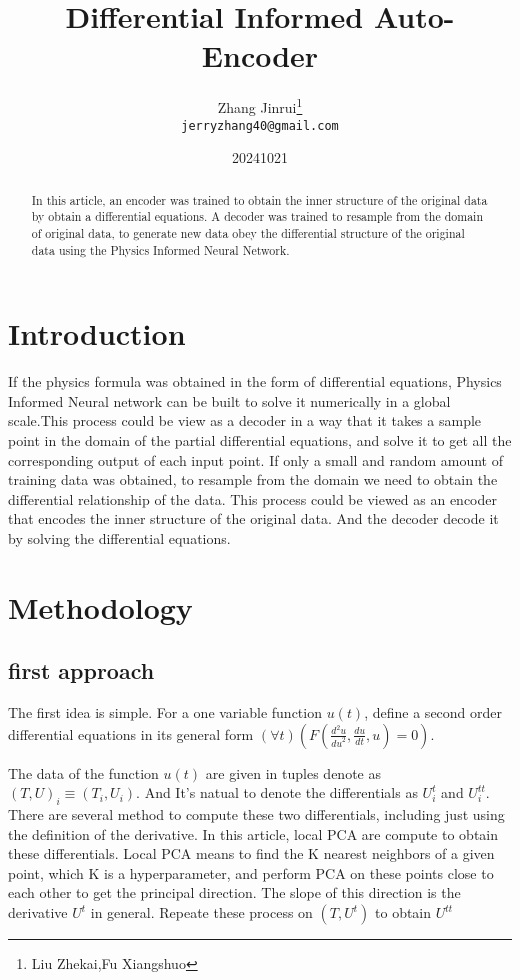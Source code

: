 \documentclass{article}
\title{Differential Informed Auto-Encoder}
\author{Zhang Jinrui\thanks{Liu Zhekai,Fu Xiangshuo} \\ \texttt{jerryzhang40@gmail.com}}
\date{20241021}  %
\begin{document}
\maketitle

\begin{abstract}
    In this article, an encoder was trained to obtain the inner
    structure of the original data by obtain a differential equations.
    A decoder was trained to resample from the domain of original data,
    to generate new data obey the differential structure of the original
    data using the Physics Informed Neural Network\cite[PINN]{raissi2017physics}.
\end{abstract}

\section{Introduction}
If the physics formula was obtained in the form of differential equations,
Physics Informed Neural network can be built to solve it numerically
in a global scale\cite[PINN]{raissi2017physics}.This process could be view
as a decoder in a way that it takes a sample point in the domain of
the partial differential equations, and solve it to get all the corresponding
output of each input point. If only a small and random amount of
training data was obtained, to resample from the domain we need
to obtain the differential relationship of the data. This process
could be viewed as an encoder that encodes the inner structure of
the original data. And the decoder decode it by solving the
differential equations.

\section{Methodology}
\subsection{first approach}
The first idea is simple. For a one variable function $u(t)$,
define a second order differential equations
in its general form $(\forall t)(F(\frac{d^2u}{{du}^2},\frac{du}{dt},u)=0)$.

The data of the function $u(t)$ are given in tuples denote as
$(T,U)_i\equiv(T_i,U_i)$. And It's natual to denote the differentials
as $U^{t}_{i}$ and $U^{tt}_{i}$. There are several method to compute
these two differentials, including just using the definition of
the derivative. In this article, local PCA are compute to obtain
these differentials. Local PCA means to find the K nearest neighbors
of a given point, which K is a hyperparameter, and perform PCA
on these points close to each other to get the principal direction.
The slope of this direction is the derivative $U^{t}$ in general.
Repeate these process on $(T,U^{t})$ to obtain $U^{tt}$
\end{document}
